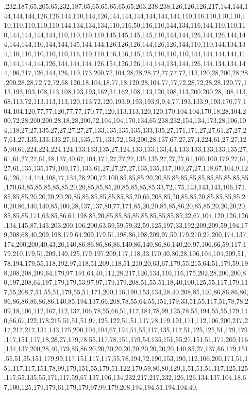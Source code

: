 ,232,187,65,205,65,232,187,65,65,65,65,65,65,203,238,238,126,126,126,217,144,144,144,144,144,126,126,144,110,144,126,144,144,144,144,144,144,110,116,110,110,110,110,110,110,110,110,144,134,134,134,110,116,50,116,110,144,134,116,144,110,110,110,144,144,144,144,110,110,110,110,145,145,145,145,110,144,144,126,144,126,144,144,144,144,110,144,144,145,144,144,126,126,126,144,126,126,144,110,110,144,134,134,110,110,110,110,110,116,110,110,116,116,145,145,110,110,110,144,144,144,144,110,144,144,144,126,144,144,144,126,154,126,126,144,144,134,144,126,144,134,134,144,196,217,126,144,126,110,173,200,72,104,28,28,28,72,77,77,72,113,120,28,200,28,28,200,28,28,72,72,72,68,120,18,104,18,77,18,120,28,104,77,77,72,28,72,28,28,120,77,113,193,193,108,113,108,193,193,162,34,162,108,113,120,108,113,200,200,28,108,113,68,113,72,113,113,113,120,113,72,120,193,9,193,193,9,9,4,77,193,133,9,193,170,77,104,104,120,77,77,120,77,77,170,77,120,113,113,120,120,170,104,104,170,18,28,104,200,72,28,200,200,28,18,28,200,72,104,104,170,134,65,238,232,154,134,173,28,106,104,118,27,27,135,27,27,27,27,27,133,135,135,135,133,135,27,171,171,27,27,61,27,27,27,61,27,135,133,133,27,61,135,171,133,72,153,200,28,137,67,27,27,4,224,61,27,27,125,90,61,224,224,224,124,133,133,135,27,124,133,133,133,4,4,133,133,133,133,135,27,61,61,27,27,61,18,137,40,67,104,171,27,27,27,135,135,27,27,27,61,100,100,179,27,61,27,61,135,135,179,100,171,133,61,27,27,27,27,135,135,117,100,27,27,118,67,104,9,126,126,144,144,108,77,134,28,200,72,100,85,85,85,20,20,85,85,85,85,85,85,85,85,85,85,170,63,85,85,85,85,85,20,20,85,85,85,20,85,85,85,85,33,72,175,143,143,143,106,171,85,85,85,20,20,20,20,20,85,85,85,85,85,85,85,20,66,208,85,20,85,85,20,85,85,85,85,20,20,86,140,140,85,100,28,137,137,80,77,171,85,20,20,85,85,86,20,85,85,20,20,20,20,85,85,85,171,63,85,86,61,198,85,20,85,85,85,85,85,85,85,85,85,32,67,104,120,126,126,134,145,87,143,203,200,106,200,63,59,59,59,32,59,125,197,33,192,209,209,59,194,179,208,68,40,209,198,179,64,209,179,51,198,86,198,209,97,59,179,210,27,200,174,137,174,200,200,40,43,20,140,86,86,86,86,86,140,86,140,86,86,140,20,97,106,66,59,117,179,210,179,51,209,140,125,179,197,209,117,118,33,170,40,80,28,106,104,104,209,51,78,194,179,55,118,192,97,118,51,209,118,51,210,20,63,67,179,55,215,64,51,179,59,198,208,208,209,64,179,97,191,64,40,112,28,217,126,134,110,116,175,202,28,200,200,80,197,208,64,197,179,179,53,97,97,179,179,208,51,55,51,18,40,100,125,55,117,179,117,55,208,7,51,55,51,179,55,51,171,200,116,190,153,134,28,40,208,85,140,86,86,86,86,86,86,86,86,86,86,140,85,194,137,66,208,78,55,64,55,151,179,33,51,55,117,51,78,78,209,18,106,112,167,112,137,106,78,55,66,51,117,184,78,99,125,78,55,194,55,55,179,140,66,67,122,178,215,51,51,51,97,125,122,51,51,117,78,179,191,171,112,106,200,217,217,217,217,134,143,175,200,104,104,67,194,51,55,117,135,117,51,125,125,51,179,179,117,151,117,18,28,27,179,78,55,117,78,151,179,54,135,151,55,27,151,51,171,200,116,134,137,200,28,40,179,85,86,20,20,20,20,20,20,20,20,20,20,140,85,27,137,66,179,151,55,51,55,151,179,99,117,151,117,117,55,78,194,72,190,153,190,112,106,200,171,51,151,117,117,151,78,99,179,151,55,179,51,122,179,59,80,80,129,1,51,51,51,117,125,125,117,55,135,55,171,117,59,67,137,106,134,232,217,217,232,126,126,134,137,104,18,67,100,125,179,179,61,179,179,97,99,179,208,194,194,51,194,104,40,